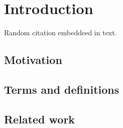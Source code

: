 \section{Introduction}\label{introduction}

Random citation \cite{mm2009} embeddeed in text.


\subsection{Motivation}\label{motivation}

\subsection{Terms and definitions}\label{Terms and definitions}

\subsection{Related work}\label{Related work}